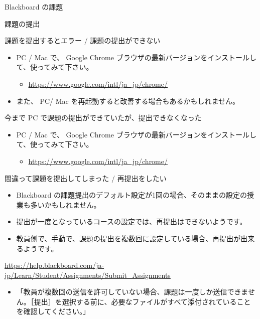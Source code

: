 \documentclass[a4j,10pt]{jsarticle}
\begin{document}
{\newpage\clearpage
{}%
\begin{frame}[label={sec:org02882cd},fragile]{Blackboard の課題}
\begin{block}{課題の提出}
\begin{block}{課題を提出するとエラー / 課題の提出ができない}
\begin{itemize}
\item PC / Mac で、 Google Chrome ブラウザの最新バージョンをインストールして、使ってみて下さい。
\begin{itemize}
\item \url{https://www.google.com/intl/ja\_jp/chrome/}
\end{itemize}
\par
\item また、 PC/ Mac を再起動すると改善する場合もあるかもしれません。
\end{itemize}
\end{block}
\par
\begin{block}{今まで PC で課題の提出ができていたが、提出できなくなった}
\begin{itemize}
\item PC / Mac で、 Google Chrome ブラウザの最新バージョンをインストールして、使ってみて下さい。
\begin{itemize}
\item \url{https://www.google.com/intl/ja\_jp/chrome/}
\end{itemize}
\end{itemize}
\end{block}
\par
\begin{block}{間違って課題を提出してしまった / 再提出をしたい}
\begin{itemize}
\item Blackboard の課題提出のデフォルト設定が1回の場合、そのままの設定の授業も多いかもしれません。
\item 提出が一度となっているコースの設定では、再提出はできないようです。
\item 教員側で、手動で、課題の提出を複数回に設定している場合、再提出が出来るようです。
\end{itemize}
\par
\url{https://help.blackboard.com/ja-jp/Learn/Student/Assignments/Submit\_Assignments}
\par
\begin{itemize}
\item 「教員が複数回の送信を許可していない場合、課題は一度しか送信できません。［提出］を選択する前に、必要なファイルがすべて添付されていることを確認してください。」

\end{itemize}
\end{block}
\end{block}
\end{frame}}
\end{document}
